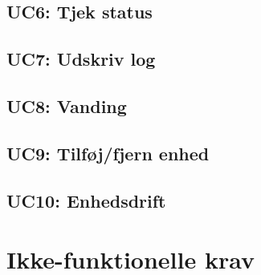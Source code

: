 
\subsection{UC6: Tjek status}



\subsection{UC7: Udskriv log}



\subsection{UC8: Vanding}



\subsection{UC9: Tilføj/fjern enhed}



\subsection{UC10: Enhedsdrift}



\section{Ikke-funktionelle krav}
